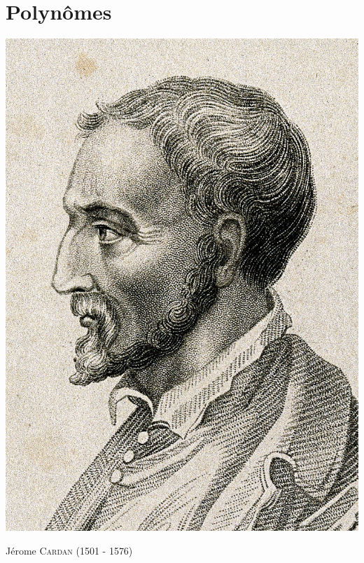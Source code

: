 \chapter{Polynômes}

\begin{marginfigure}[5cm]
    \centering
    \includegraphics{images/jerome_cardan.jpg}
    \caption*{\centering Jérome \textsc{Cardan} (1501 - 1576)}
\end{marginfigure}

